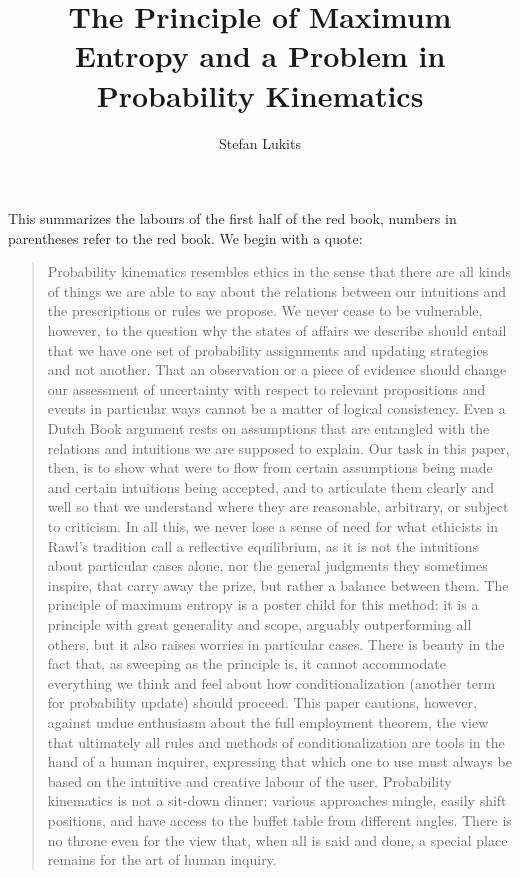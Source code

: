 \documentclass[11pt]{article}
\newenvironment{quotex}{\begin{quote}\begin{footnotesize}}{\end{footnotesize}\end{quote}}
\begin{document}
\title{The Principle of Maximum Entropy and a Problem in Probability Kinematics}

\author{Stefan Lukits}

\maketitle


\setcounter{chap}{1}

This summarizes the labours of the first half of the red book, numbers
in parentheses refer to the red book. We begin with a quote:

\begin{quotex} 
  Probability kinematics resembles ethics in the sense that there are
  all kinds of things we are able to say about the relations between
  our intuitions and the prescriptions or rules we propose. We never
  cease to be vulnerable, however, to the question why the states of
  affairs we describe should entail that we have one set of
  probability assignments and updating strategies and not another.
  That an observation or a piece of evidence should change our
  assessment of uncertainty with respect to relevant propositions and
  events in particular ways cannot be a matter of logical consistency.
  Even a Dutch Book argument rests on assumptions that are entangled
  with the relations and intuitions we are supposed to explain. Our
  task in this paper, then, is to show what were to flow from certain
  assumptions being made and certain intuitions being accepted, and to
  articulate them clearly and well so that we understand where they
  are reasonable, arbitrary, or subject to criticism. In all this, we
  never lose a sense of need for what ethicists in Rawl's tradition
  call a reflective equilibrium, as it is not the intuitions about
  particular cases alone, nor the general judgments they sometimes
  inspire, that carry away the prize, but rather a balance between
  them. The principle of maximum entropy is a poster child for this
  method: it is a principle with great generality and scope, arguably
  outperforming all others, but it also raises worries in particular
  cases. There is beauty in the fact that, as sweeping as the
  principle is, it cannot accommodate everything we think and feel
  about how conditionalization (another term for probability update)
  should proceed. This paper cautions, however, against undue
  enthusiasm about the full employment theorem, the view that
  ultimately all rules and methods of conditionalization are tools in
  the hand of a human inquirer, expressing that which one to use must
  always be based on the intuitive and creative labour of the user.
  Probability kinematics is not a sit-down dinner: various approaches
  mingle, easily shift positions, and have access to the buffet table
  from different angles. There is no throne even for the view that,
  when all is said and done, a special place remains for the art of
  human inquiry.
\end{quotex}
\end{document}
